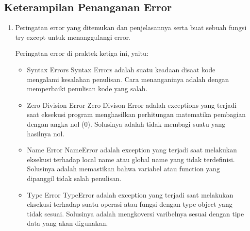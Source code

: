 \subsection{Keterampilan Penanganan Error}
\begin{enumerate}
	\item Peringatan error yang ditemukan dan penjelasannya serta buat sebuah fungsi try except untuk menanggulangi error.
	
	Peringatan error di praktek ketiga ini, yaitu:
	\begin{itemize}
		\item Syntax Errors
		Syntax Errors adalah suatu keadaan disaat kode mengalami kesalahan penulisan. Cara menanganinya adalah dengan memperbaiki penulisan kode yang salah.
		
		\item Zero Division Error
		Zero Divison Error adalah exceptions yang terjadi saat eksekusi program menghasilkan perhitungan matematika pembagian dengan angka nol (0). Solusinya adalah tidak membagi suatu yang hasilnya nol.
		
		\item Name Error
		NameError adalah exception yang terjadi saat melakukan eksekusi terhadap local name atau global name yang tidak terdefinisi. Solusinya adalah memastikan bahwa variabel atau function yang dipanggil tidak salah penulisan.
		
		\item Type Error
		TypeError adalah exception yang terjadi saat melakukan eksekusi terhadap suatu operasi atau fungsi dengan type object yang tidak sesuai. Solusinya adalah mengkoversi varibelnya sesuai dengan tipe data yang akan digunakan.
		
	\end{itemize}
\end{enumerate}

